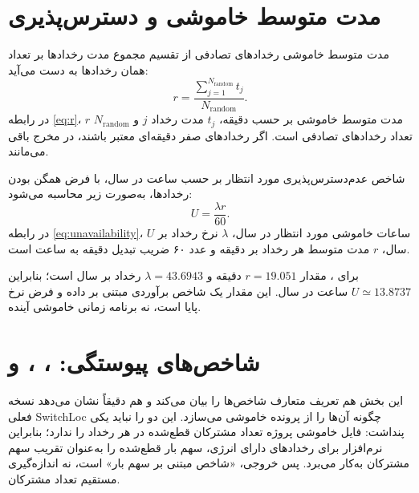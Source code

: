 \documentclass[11pt,a4paper,oneside]{book}
\newcommand{\code}[1]{\lr{\texttt{#1}}}
\begin{document}
\section{مدت متوسط خاموشی و دسترس‌پذیری}
مدت متوسط خاموشی رخدادهای تصادفی از تقسیم مجموع مدت رخدادها بر تعداد همان رخدادها به دست می‌آید:
\begin{equation}
 r=\frac{\sum_{j=1}^{N_{\mathrm{random}}}t_j}{N_{\mathrm{random}}}.
 \label{eq:r}
\end{equation}
در رابطه \eqref{eq:r}، $r$ مدت متوسط خاموشی بر حسب دقیقه، $t_j$ مدت رخداد $j$ و $N_{\mathrm{random}}$ تعداد رخدادهای تصادفی است. اگر رخدادهای صفر دقیقه‌ای معتبر باشند، در مخرج باقی می‌مانند.

شاخص عدم‌دسترس‌پذیری مورد انتظار بر حسب ساعت در سال، با فرض همگن بودن رخدادها، به‌صورت زیر محاسبه می‌شود:
\begin{equation}
 U=\frac{\lambda r}{60}.
 \label{eq:unavailability}
\end{equation}
در رابطه \eqref{eq:unavailability}، $U$ ساعات خاموشی مورد انتظار در سال، $\lambda$ نرخ رخداد بر سال، $r$ مدت متوسط هر رخداد بر دقیقه و عدد ۶۰ ضریب تبدیل دقیقه به ساعت است.

برای \code{F5}، مقدار $r=19.051$ دقیقه و $\lambda=43.6943$ رخداد بر سال است؛ بنابراین $U\simeq13.8737$ ساعت در سال. این مقدار یک شاخص برآوردی مبتنی بر داده و فرض نرخ پایا است، نه برنامه زمانی خاموشی آینده.

\section{شاخص‌های پیوستگی: ، ،  و }
این بخش هم تعریف متعارف شاخص‌ها را بیان می‌کند و هم دقیقاً نشان می‌دهد نسخه فعلی SwitchLoc چگونه آن‌ها را از پرونده خاموشی می‌سازد. این دو را نباید یکی پنداشت: فایل خاموشی پروژه تعداد مشترکان قطع‌شده در هر رخداد را ندارد؛ بنابراین نرم‌افزار برای رخدادهای دارای انرژی، سهم بار قطع‌شده را به‌عنوان تقریب سهم مشترکان به‌کار می‌برد. پس خروجی، «شاخص مبتنی بر سهم بار» است، نه اندازه‌گیری مستقیم تعداد مشترکان.
\end{document}
